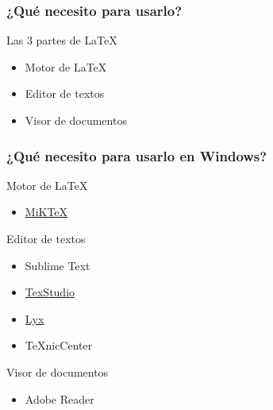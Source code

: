 \documentclass[12pt]{beamer}
\begin{document}
\begin{frame}%
  \frametitle{¿Qué necesito para usarlo?}
  \begin{block}{Las 3 partes de \textrm{\LaTeX{}}}
    \begin{itemize}
    \item<2-> Motor de \textrm{\LaTeX{}}
    \item<3-> Editor de textos
    \item<4-> Visor de documentos
    \end{itemize}
  \end{block}
\end{frame}

\begin{frame}%
  \frametitle{¿Qué necesito para usarlo en Windows?}
  \begin{block}{Motor de \textrm{\LaTeX{}}}
    \begin{itemize}
    \item \href{https://miktex.org/download/ctan/systems/win32/miktex/setup/windows-x64/basic-miktex-20.6.29-x64.exe}{MiKTeX}
    \end{itemize}
  \end{block}
  \begin{block}{Editor de textos}
    \begin{itemize}
    \item Sublime Text
    \item \href{https://github.com/texstudio-org/texstudio/releases/download/2.12.22/texstudio-2.12.22-win-qt5.exe}{TexStudio}
    \item \href{https://ftp.lip6.fr/pub/lyx/bin/2.3.5/LyX-2352-Installer-4.exe}{Lyx}
    \item TeXnicCenter
    \end{itemize}
  \end{block}
  \begin{block}{Visor de documentos}
    \begin{itemize}
    \item Adobe Reader
    \end{itemize}
  \end{block}
\end{frame}
\end{document}
